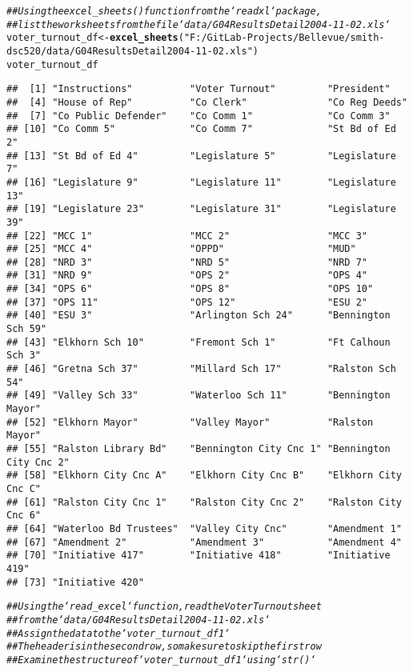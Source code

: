 \documentclass{article}\usepackage[]{graphicx}\usepackage[]{xcolor}
\makeatletter
\newcommand{\hlstr}[1]{\textcolor[rgb]{0.192,0.494,0.8}{#1}}%
\newcommand{\hlcom}[1]{\textcolor[rgb]{0.678,0.584,0.686}{\textit{#1}}}%
\newcommand{\hlstd}[1]{\textcolor[rgb]{0.345,0.345,0.345}{#1}}%
\newcommand{\hlkwb}[1]{\textcolor[rgb]{0.69,0.353,0.396}{#1}}%
\newcommand{\hlkwd}[1]{\textcolor[rgb]{0.737,0.353,0.396}{\textbf{#1}}}%
\newenvironment{kframe}{%
 \def\at@end@of@kframe{}%
 \ifinner\ifhmode%
  \def\at@end@of@kframe{\end{minipage}}%
  \begin{minipage}{\columnwidth}%
 \fi\fi%
 \def\FrameCommand##1{\hskip\@totalleftmargin \hskip-\fboxsep
 \colorbox{shadecolor}{##1}\hskip-\fboxsep
     \hskip-\linewidth \hskip-\@totalleftmargin \hskip\columnwidth}%
 \MakeFramed {\advance\hsize-\width
   \@totalleftmargin\z@ \linewidth\hsize
   \@setminipage}}%
 {\par\unskip\endMakeFramed%
 \at@end@of@kframe}
\newenvironment{knitrout}{}{} %
\makeatother
\begin{document}
\begin{knitrout}
\begin{kframe}
\begin{alltt}
\hlcom{## Using the excel_sheets() function from the `readxl` package,}
\hlcom{## list the worksheets from the file `data/G04ResultsDetail2004-11-02.xls`}
\hlstd{voter_turnout_df} \hlkwb{<-} \hlkwd{excel_sheets}\hlstd{(}\hlstr{"F:/GitLab-Projects/Bellevue/smith-dsc520/data/G04ResultsDetail2004-11-02.xls"}\hlstd{)}
\hlstd{voter_turnout_df}
\end{alltt}
\begin{verbatim}
##  [1] "Instructions"          "Voter Turnout"         "President"            
##  [4] "House of Rep"          "Co Clerk"              "Co Reg Deeds"         
##  [7] "Co Public Defender"    "Co Comm 1"             "Co Comm 3"            
## [10] "Co Comm 5"             "Co Comm 7"             "St Bd of Ed 2"        
## [13] "St Bd of Ed 4"         "Legislature 5"         "Legislature 7"        
## [16] "Legislature 9"         "Legislature 11"        "Legislature 13"       
## [19] "Legislature 23"        "Legislature 31"        "Legislature 39"       
## [22] "MCC 1"                 "MCC 2"                 "MCC 3"                
## [25] "MCC 4"                 "OPPD"                  "MUD"                  
## [28] "NRD 3"                 "NRD 5"                 "NRD 7"                
## [31] "NRD 9"                 "OPS 2"                 "OPS 4"                
## [34] "OPS 6"                 "OPS 8"                 "OPS 10"               
## [37] "OPS 11"                "OPS 12"                "ESU 2"                
## [40] "ESU 3"                 "Arlington Sch 24"      "Bennington Sch 59"    
## [43] "Elkhorn Sch 10"        "Fremont Sch 1"         "Ft Calhoun Sch 3"     
## [46] "Gretna Sch 37"         "Millard Sch 17"        "Ralston Sch 54"       
## [49] "Valley Sch 33"         "Waterloo Sch 11"       "Bennington Mayor"     
## [52] "Elkhorn Mayor"         "Valley Mayor"          "Ralston Mayor"        
## [55] "Ralston Library Bd"    "Bennington City Cnc 1" "Bennington City Cnc 2"
## [58] "Elkhorn City Cnc A"    "Elkhorn City Cnc B"    "Elkhorn City Cnc C"   
## [61] "Ralston City Cnc 1"    "Ralston City Cnc 2"    "Ralston City Cnc 6"   
## [64] "Waterloo Bd Trustees"  "Valley City Cnc"       "Amendment 1"          
## [67] "Amendment 2"           "Amendment 3"           "Amendment 4"          
## [70] "Initiative 417"        "Initiative 418"        "Initiative 419"       
## [73] "Initiative 420"
\end{verbatim}
\begin{alltt}
\hlcom{## Using the `read_excel` function, read the Voter Turnout sheet}
\hlcom{## from the `data/G04ResultsDetail2004-11-02.xls`}
\hlcom{## Assign the data to the `voter_turnout_df1`}
\hlcom{## The header is in the second row, so make sure to skip the first row}
\hlcom{## Examine the structure of `voter_turnout_df1` using `str()`}


\end{alltt}
\end{kframe}
\end{knitrout}
\end{document}
